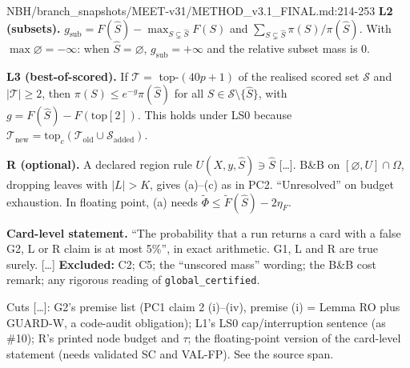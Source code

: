 \begin{stmt}{NBH/branch_snapshots/MEET-v31/METHOD_v3.1_FINAL.md:214-253}
\textbf{L2 (subsets).} $g_{\mathrm{sub}}=F(\hat S)-\max_{S\subsetneq\hat S}F(S)$ and $\sum_{S\subsetneq\hat S}\pi(S)/\pi(\hat S)$. With
$\max\varnothing=-\infty$: when $\hat S=\varnothing$, $g_{\mathrm{sub}}=+\infty$ and the relative subset mass is 0.

\textbf{L3 (best-of-scored).} If $\mathcal T=$ top-$(40p+1)$ of the realised scored set $\mathcal S$ and $|\mathcal T|\ge2$, then
$\pi(S)\le e^{-g}\pi(\hat S)$ for all $S\in\mathcal S\setminus\{\hat S\}$, with $g=F(\hat S)-F(\mathrm{top}[2])$. This holds under LS0 because
$\mathcal T_{\mathrm{new}}=\mathrm{top}_c(\mathcal T_{\mathrm{old}}\cup\mathcal S_{\mathrm{added}})$.

\textbf{R (optional).} A declared region rule $U(X,y,\hat S)\ni\hat S$ [\dots]. B\&B on $[\varnothing,U]\cap\Omega$, dropping leaves with
$|L|>K$, gives (a)--(c) as in PC2. ``Unresolved'' on budget exhaustion. In floating point, (a) needs $\tilde\Phi\le\tilde F(\hat S)-2\eta_F$.

\textbf{Card-level statement.} ``The probability that a run returns a card with a false G2, L or R claim is at most 5\%'', in exact
arithmetic. G1, L and R are true surely. [\dots] \textbf{Excluded:} C2; C5; the ``unscored mass'' wording; the B\&B cost remark; any
rigorous reading of \texttt{global\_certified}.
\end{stmt}
Cuts [\dots]: G2's premise list (PC1 claim 2 (i)--(iv), premise (i) = Lemma RO plus GUARD-W, a code-audit obligation);
L1's LS0 cap/interruption sentence (as \#10); R's printed node budget and $\tau$; the floating-point version of the card-level
statement (needs validated SC and VAL-FP). See the source span.

